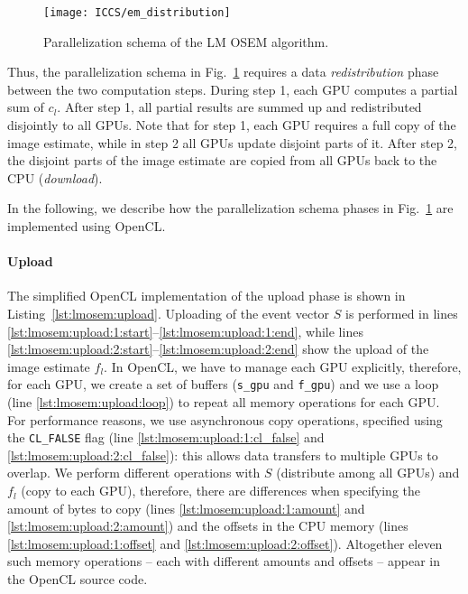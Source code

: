 \begin{figure}
  \centering
  \texttt{[image: ICCS/em\_distribution]}
  \caption{Parallelization schema of the LM OSEM algorithm.}
  \label{fig:lmosem:em_distribution}
\end{figure}
Thus, the parallelization schema in Fig.~\ref{fig:lmosem:em_distribution} requires a data \emph{redistribution} phase between the two computation steps.
During step 1, each GPU computes a partial sum of $c_l$.
After step 1, all partial results are summed up and redistributed disjointly to all GPUs.
Note that for step 1, each GPU requires a full copy of the image estimate, while in step 2 all GPUs update disjoint parts of it.
After step 2, the disjoint parts of the image estimate are copied from all GPUs back to the CPU (\emph{download}).

\bigskip\noindent
In the following, we describe how the parallelization schema phases in Fig.~\ref{fig:lmosem:em_distribution} are implemented using OpenCL.

\paragraph{Upload}
The simplified OpenCL implementation of the upload phase is shown in Listing~\ref{lst:lmosem:upload}.
Uploading of the event vector $S$ is performed in lines \ref{lst:lmosem:upload:1:start}--\ref{lst:lmosem:upload:1:end}, while lines \ref{lst:lmosem:upload:2:start}--\ref{lst:lmosem:upload:2:end} show the upload of the image estimate $f_l$.
In OpenCL, we have to manage each GPU explicitly, therefore, for each GPU, we create a set of buffers (\texttt{s\_gpu} and \texttt{f\_gpu}) and we use a loop (line \ref{lst:lmosem:upload:loop}) to repeat all memory operations for each GPU.
For performance reasons, we use asynchronous copy operations, specified using the \texttt{CL\_FALSE} flag (line \ref{lst:lmosem:upload:1:cl_false} and \ref{lst:lmosem:upload:2:cl_false}): this allows data transfers to multiple GPUs to overlap.
We perform different operations with $S$ (distribute among all GPUs) and $f_l$ (copy to each GPU), therefore, there are differences when specifying the amount of bytes to copy (lines \ref{lst:lmosem:upload:1:amount} and \ref{lst:lmosem:upload:2:amount}) and the offsets in the CPU memory (lines \ref{lst:lmosem:upload:1:offset} and \ref{lst:lmosem:upload:2:offset}).
Altogether eleven such memory operations -- each with different amounts and offsets -- appear in the OpenCL source code.

